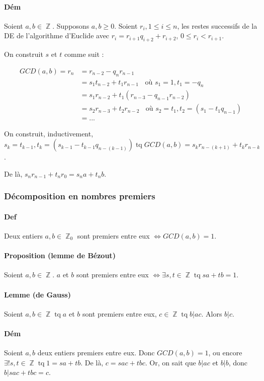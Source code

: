 \documentclass{article}
\DeclareMathOperator{\tq}{\text{ tq }}
\DeclareMathOperator{\Z}{\mathbb Z}
\begin{document}
			\paragraph{Dém} Soient $a, b \in \Z$. Supposons $a, b \geq 0$. Soient $r_i, 1 \leq i \leq n$, les restes successifs de la DE
			de l'algorithme d'Euclide avec $r_i = r_{i+1}q_{i+2} + r_{i+2}$, $0 \leq r_{i} < r_{i+1}$.

			On construit $s$ et $t$ comme suit :

			\[\begin{aligned}
				GCD(a, b) = r_n &= r_{n-2} - q_nr_{n-1} \\
								&= s_1t_{n-2} + t_1r_{n-1} \;\; \text{	où $s_1 = 1, t_1 = -q_n$} \\
								&= s_1r_{n-2} + t_1(r_{n-3} - q_{n-1}r_{n-2}) \\
								&= s_2r_{n-3} + t_2r_{n-2} \;\; \text{	où $s_2 = t_1, t_2 = (s_1 - t_1q_{n-1})$} \\
								&= ...
			\end{aligned}\]

			On construit, inductivement, $s_k = t_{k-1}, t_k = (s_{k-1} - t_{k-1}q_{n-(k-1)}) \tq GCD(a, b) = s_kr_{n-(k+1)} + t_kr_{n-k}$.

			De là, $s_nr_{n-1} + t_nr_0 = s_na + t_nb$.

			\subsubsection{Décomposition en nombres premiers}

			\paragraph{Def} Deux entiers $a, b \in \Z_0$ sont premiers entre eux $\iff GCD(a, b) = 1$.

			\paragraph{Proposition (lemme de Bézout)} Soient $a, b \in \Z$. $a$ et $b$ sont premiers entre eux
			$\iff \exists s, t \in \Z \tq sa + tb = 1$.

			\paragraph{Lemme (de Gauss)} Soient $a, b \in \Z \tq a$ et $b$ sont premiers entre eux, $c \in \Z \tq b|ac$. Alors $b|c$.

			\paragraph{Dém} Soient $a, b$ deux entiers premiers entre eux. Donc $GCD(a, b) = 1$, ou encore $\exists! s, t \in \Z \tq
			1 = sa + tb$. De là, $c = sac + tbc$. Or, on sait que $b|ac$ et $b|b$, donc $b|sac + tbc = c$.
\end{document}
